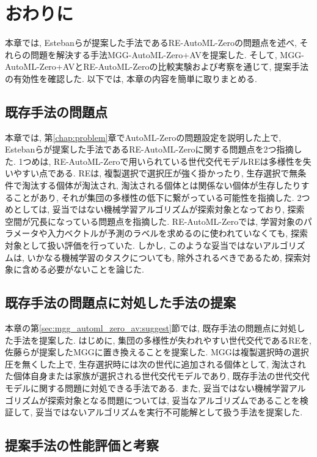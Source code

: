 \documentclass[11pt,oneside,openany,report]{jsbook}
\begin{document}
\section{おわりに}
本章では, Estebanらが提案した手法であるRE-AutoML-Zeroの問題点を述べ, それらの問題を解決する手法MGG-AutoML-Zero+AVを提案した. そして, MGG-AutoML-Zero+AVとRE-AutoML-Zeroの比較実験および考察を通じて, 提案手法の有効性を確認した. 以下では, 本章の内容を簡単に取りまとめる.

\subsection{既存手法の問題点}\label{subsec:mgg_auto_ml_zero:end:problem}

本章では, 第\ref{chap:problem}章でAutoML-Zeroの問題設定を説明した上で, Estebanらが提案した手法であるRE-AutoML-Zeroに関する問題点を2つ指摘した. 1つめは, RE-AutoML-Zeroで用いられている世代交代モデルREは多様性を失いやすい点である. REは, 複製選択で選択圧が強く掛かったり, 生存選択で無条件で淘汰する個体が淘汰され, 淘汰される個体とは関係ない個体が生存したりすることがあり, それが集団の多様性の低下に繋がっている可能性を指摘した. 2つめとしては, 妥当ではない機械学習アルゴリズムが探索対象となっており, 探索空間が冗長になっている問題点を指摘した. RE-AutoML-Zeroでは, 学習対象のパラメータや入力ベクトルが予測のラベルを求めるのに使われていなくても, 探索対象として扱い評価を行っていた. しかし, このような妥当ではないアルゴリズムは, いかなる機械学習のタスクについても, 除外されるべきであるため, 探索対象に含める必要がないことを論じた.

\subsection{既存手法の問題点に対処した手法の提案}\label{subsec:mgg_auto_ml_zero:end:suggest}

本章の第\ref{sec:mgg_automl_zero_av:suggest}節では, 既存手法の問題点に対処した手法を提案した. はじめに, 集団の多様性が失われやすい世代交代であるREを, 佐藤らが提案したMGGに置き換えることを提案した. MGGは複製選択時の選択圧を無くした上で, 生存選択時には次の世代に追加される個体として, 淘汰された個体自身または家族が選択される世代交代モデルであり, 既存手法の世代交代モデルに関する問題に対処できる手法である. また, 妥当ではない機械学習アルゴリズムが探索対象となる問題については, 妥当なアルゴリズムであることを検証して, 妥当ではないアルゴリズムを実行不可能解として扱う手法を提案した.

\subsection{提案手法の性能評価と考察}\label{subsec:mgg_auto_ml_zero:end:result}
\end{document}
